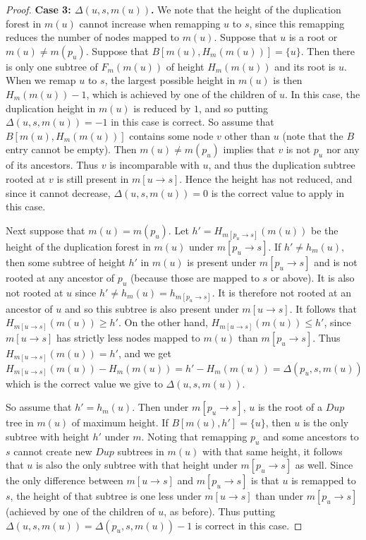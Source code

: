 \documentclass[10pt]{article}
\begin{document}
\begin{proof}
    \medskip 

    \noindent 
    \textbf{Case 3: $\Delta(u, s, m(u))$.}
    We note that the height of the duplication forest in $m(u)$ cannot increase when remapping $u$ to $s$, since this remapping reduces the number of nodes mapped to $m(u)$.
    Suppose that $u$ is a root or $m(u) \neq m(p_u)$.  
    Suppose that $B[m(u), H_m(m(u))] = \{u\}$.  Then there is only one subtree of $F_m(m(u))$ of height $H_m(m(u))$ and its root is $u$.
    When we remap $u$ to $s$, the largest possible height in $m(u)$ is then $H_m(m(u)) - 1$, which is achieved by one of the children of $u$.  In this case, the duplication height in $m(u)$ is reduced by $1$, and so putting $\Delta(u, s, m(u)) = -1$ in this case is correct.
    So assume that $B[m(u), H_m(m(u))]$ contains some node $v$ other than $u$ (note that the $B$ entry cannot be empty).  Then $m(u) \neq m(p_u)$ implies that $v$ is not $p_u$ nor any of its ancestors.  Thus $v$ is incomparable with $u$, and thus the duplication subtree rooted at $v$ is still present in $m[u \rightarrow s]$.  Hence the height has not reduced, and since it cannot decrease, $\Delta(u, s, m(u)) = 0$ is the correct value to apply in this case.
    


    Next suppose that $m(u) = m(p_u)$.  Let $h' = H_{m[p_u \rightarrow s]}(m(u))$ be the height of the duplication forest in $m(u)$ under $m[p_u \rightarrow s]$. If $h' \neq h_m(u)$, then some subtree of height $h'$ in $m(u)$ is present under $m[p_u \rightarrow s]$ and is not rooted at any ancestor of $p_u$  (because those are mapped to $s$ or above).  It is also not rooted at $u$ since $h' \neq h_m(u) = h_{m[p_u \rightarrow s]}$.  It is therefore not rooted at an ancestor of $u$ and so this subtree is also present under $m[u \rightarrow s]$.  It follows that $H_{m[u \rightarrow s]}(m(u)) \geq h'$.  On the other hand, $H_{m[u \rightarrow s]}(m(u)) \leq  h'$, since $m[u \rightarrow s]$ has strictly less nodes mapped to $m(u)$ than $m[p_u \rightarrow s]$.  Thus $H_{m[u \rightarrow s]}(m(u)) = h'$, and we get 
    \[
    H_{m[u \rightarrow s]}(m(u)) - H_m(m(u)) = h' - H_m(m(u)) = \Delta(p_u, s, m(u))
    \]
    which is the correct value we give to $\Delta(u, s, m(u))$.
    
    
    So assume that $h' = h_m(u)$.  
    Then under $m[p_u \rightarrow s]$, $u$ is the root of a $Dup$ tree in $m(u)$ of maximum height.  If $B[m(u), h'] = \{u\}$, then $u$ is the only subtree with height $h'$ under $m$.  Noting that remapping $p_u$ and some ancestors to $s$ cannot create new $Dup$ subtrees in $m(u)$ with that same height, it follows that $u$ is also the only subtree with that height under $m[p_u \rightarrow s]$ as well.  Since the only difference between $m[u \rightarrow s]$ and $m[p_u \rightarrow s]$ is that $u$ is remapped to $s$, the height of that subtree is one less under $m[u \rightarrow s]$ than under $m[p_u \rightarrow s]$ (achieved by one of the children of $u$, as before).
    Thus putting $\Delta(u, s, m(u)) = \Delta(p_u, s, m(u)) - 1$ is correct in this case.


\end{proof}
\end{document}

